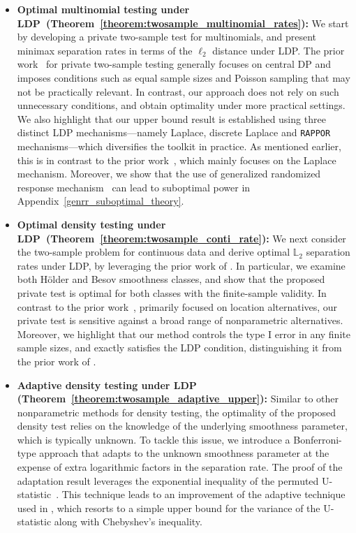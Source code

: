 \documentclass[twoside,11pt]{article}
\begin{document}
\begin{itemize}
	\item \textbf{Optimal multinomial testing under LDP~(Theorem~\ref{theorem:twosample_multinomial_rates}):} We start by developing a private two-sample test for multinomials, and present minimax separation rates in terms of the $\ell_2$ distance under LDP. The prior work~\cite{Acharya2018dPGofTwosample, Aliakbarpour2019PrivatePermutations,Aliakbarpour2018DPgof} for private two-sample testing generally focuses on central DP and imposes conditions such as equal sample sizes and Poisson sampling that may not be practically relevant. In contrast, our approach does not rely on such unnecessary conditions, and obtain optimality under more practical settings. We also highlight that our upper bound result is established using three distinct LDP mechanisms{---}namely Laplace, discrete Laplace and \texttt{RAPPOR} mechanisms{---}which diversifies the toolkit in practice. As mentioned earlier, this is in contrast to the prior work~\cite{Lam-Weil2021MinimaxConstraint,Dubois2022}, which mainly focuses on the Laplace mechanism. Moreover, we show that the use of generalized randomized response mechanism~\citep{Gaboardi2018LDPChisq} can lead to suboptimal power in Appendix~\ref{genrr_suboptimal_theory}. 
	\item \textbf{Optimal density testing under LDP~(Theorem~\ref{theorem:twosample_conti_rate}):} We next consider the two-sample problem for continuous data and derive optimal $\mathbb{L}_2$ separation rates under LDP, by leveraging the prior work of \cite{Lam-Weil2021MinimaxConstraint,kim_minimax_2022}. In particular, we examine both H\"{o}lder and Besov smoothness classes, and show that the proposed private test is optimal for both classes with the finite-sample validity. In contrast to the prior work~\citep{Ding2018TwosampleMean, Waudby-Smith2022LDPTwosample}, primarily focused on location alternatives, our private test is sensitive against a broad range of nonparametric alternatives. Moreover, we highlight that our method controls the type I error in any finite sample sizes, and exactly satisfies the LDP condition, distinguishing it from the prior work of \cite{Raj2020ATest}.
	\item \textbf{Adaptive density testing under LDP (Theorem~\ref{theorem:twosample_adaptive_upper}):} Similar to other nonparametric methods for density testing, the optimality of the proposed density test relies on the knowledge of the underlying smoothness parameter, which is typically unknown. To tackle this issue, we introduce a Bonferroni-type approach that adapts to the unknown smoothness parameter at the expense of extra logarithmic factors in the separation rate. The proof of the adaptation result leverages the exponential inequality of the permuted U-statistic~\citep{kim_minimax_2022}. This technique leads to an improvement of the adaptive technique used in \citet{Lam-Weil2021MinimaxConstraint}, which resorts to a simple upper bound for the variance of the U-statistic along with Chebyshev's inequality.
	

\end{itemize}
\end{document}
